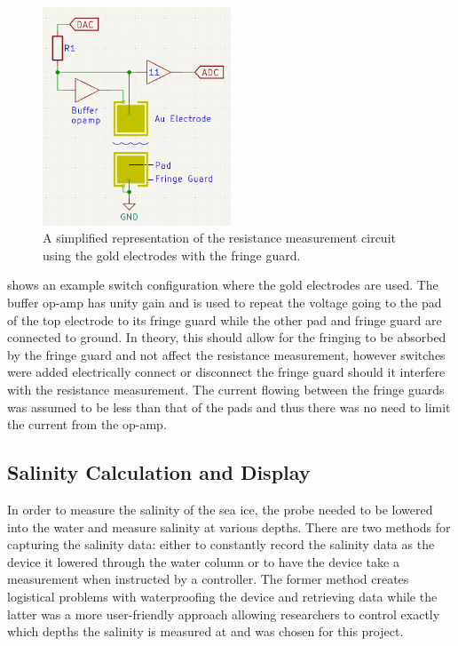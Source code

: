 \begin{figure}[!h]
    \centering
    \includegraphics[width=0.5\textwidth]{Figures/AuElectrodeExample}
    \caption{A simplified representation of the resistance measurement circuit using the gold electrodes with the fringe guard.}
    \label{fig:au-measurement-circuit} %
\end{figure}

 shows an example switch configuration where the gold electrodes are used.
The buffer op-amp has unity gain and is used to repeat the voltage going to the pad of the top electrode to its fringe guard while the other pad and fringe guard are connected to ground.
In theory, this should allow for the fringing to be absorbed by the fringe guard and not affect the resistance measurement, however switches were added electrically connect or disconnect the fringe guard should it interfere with the resistance measurement.
The current flowing between the fringe guards was assumed to be less than that of the pads and thus there was no need to limit the current from the op-amp.

\subsection{Salinity Calculation and Display}

In order to measure the salinity of the sea ice, the probe needed to be lowered into the water and measure salinity at various depths.
There are two methods for capturing the salinity data: either to constantly record the salinity data as the device it lowered through the water column or to have the device take a measurement when instructed by a controller.
The former method creates logistical problems with waterproofing the device and retrieving data while the latter was a more user-friendly approach allowing researchers to control exactly which depths the salinity is measured at and was chosen for this project.

